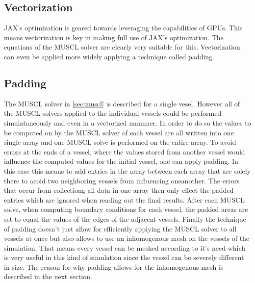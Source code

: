 \documentclass[a4paper, oneside]{discothesis}
\begin{document}
\subsection{Vectorization}
JAX's optimization is geared towards leveraging the capabilities of GPUs.
This means vectorization is key in making full use of JAX's optimization.
The equations of the MUSCL solver are clearly very suitable for this.
Vectorization can even be applied more widely applying a technique called padding.

\subsection{Padding}
The MUSCL solver in \autoref{sec:muscl} is described for a single vesel.
However all of the MUSCL solvers applied to the individual vessels could be performed simulataneously and even in a vectorized mannner.
In order to do so the values to be computed on by the MUSCL solver of each vessel are all written into one single array and one MUSCL solve is performed on the entire array.
To avoid errors at the ends of a vessel, where the values stored from another vessel would influence the computed values for the initial vessel, one can apply padding.
In this case this means to add entries in the array between each array that are solely there to acoid two neighboring vessels from influencing oneanother.
The errors that occur from collectiong all data in one array then only effect the padded entries which are ignored when reading out the final results.
After each MUSCL solve, when computing boundary conditions for each vessel, the padded areas are set to equal the values of the edges of the adjacent vessels.
Finally the technique of padding doesn't just allow for efficiently applying the MUSCL solver to all vessels at once but also allows to use an inhomogenous mesh on the vessels of the simulation.
That means every vessel can be meshed according to it's need which is very useful in this kind of simulation since the vessel can be severely different in size.
The reason for why padding allows for the inhomogenous mesh is described in the next section.
\end{document}
